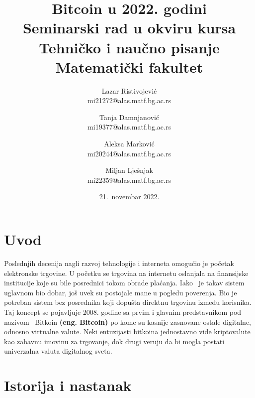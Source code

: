 \documentclass[a4paper]{article}
\begin{document}
\title{Bitcoin u 2022. godini\\ \small{Seminarski rad u okviru kursa\\Tehničko i naučno pisanje\\ Matematički fakultet}}

\author{Lazar Ristivojević\\mi21272@alas.matf.bg.ac.rs\and Tanja Damnjanović\\mi19377@alas.matf.bg.ac.rs\and Aleksa Marković\\mi20244@alas.matf.bg.ac.rs\and Miljan Lješnjak\\mi22359@alas.matf.bg.ac.rs }
\date{21.~novembar 2022.}
\maketitle


\tableofcontents


\newpage

\section{Uvod}
\label{sec:uvod}
Poslednjih decenija nagli razvoj tehnologije i interneta omogućio je početak elektronske trgovine. U početku se trgovina na internetu oslanjala na finansijske institucije koje su bile posrednici tokom obrade plaćanja. Iako  je takav sistem uglavnom bio dobar, još uvek su postojale mane u pogledu poverenja. Bio je potreban sistem bez posrednika koji dopušta direktnu trgovinu između korisnika. Taj koncept se pojavljuje 2008. godine sa prvim i glavnim predstavnikom pod nazivom  Bitkoin \textbf{(eng. Bitcoin)} po kome su kasnije zasnovane ostale digitalne, odnosno virtualne valute. Neki entuzijasti bitkoina jednostavno vide kriptovalute kao zabavnu imovinu za trgovanje, dok drugi veruju da bi mogla postati univerzalna valuta digitalnog sveta.

\section{Istorija i nastanak}
\end{document}
